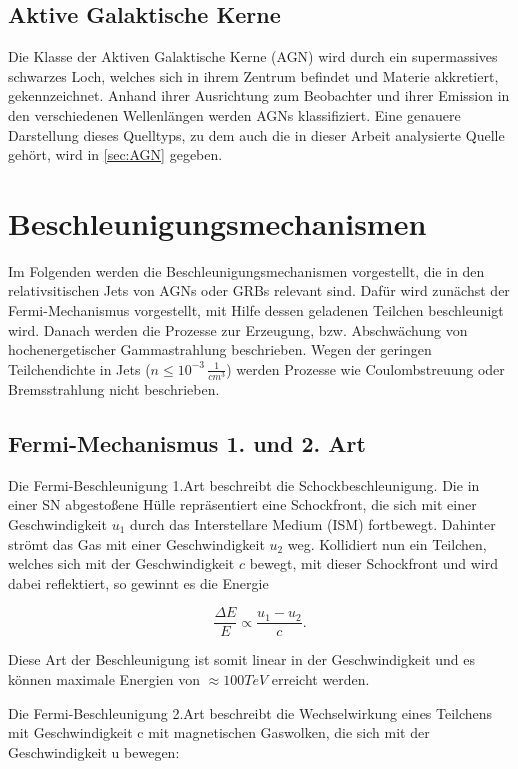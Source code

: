 \subsection{Aktive Galaktische Kerne}
Die Klasse der Aktiven Galaktische Kerne (AGN) wird durch ein supermassives schwarzes Loch, welches sich in ihrem Zentrum befindet und Materie akkretiert, gekennzeichnet. 
Anhand ihrer Ausrichtung zum Beobachter und ihrer Emission in den verschiedenen Wellenlängen werden AGNs klassifiziert. 
Eine genauere Darstellung dieses Quelltyps, zu dem auch die in dieser Arbeit analysierte Quelle gehört, wird in \autoref{sec:AGN} gegeben.

\section{Beschleunigungsmechanismen} 
\label{sec:Beschleunigungsmechanismen}
Im Folgenden werden die Beschleunigungsmechanismen vorgestellt, die in den relativsitischen Jets von AGNs oder GRBs relevant sind.
Dafür wird zunächst der Fermi-Mechanismus vorgestellt, mit Hilfe dessen geladenen Teilchen beschleunigt wird.
Danach werden die Prozesse zur Erzeugung, bzw. Abschwächung von hochenergetischer Gammastrahlung beschrieben.
Wegen der geringen Teilchendichte in Jets ($n\leq 10^{-3}\,\frac{1}{cm^3}$) werden Prozesse wie Coulombstreuung oder Bremsstrahlung nicht beschrieben.

\subsection{Fermi-Mechanismus 1. und 2. Art}
Die Fermi-Beschleunigung 1.Art beschreibt die Schockbeschleunigung.
Die in einer SN abgestoßene Hülle repräsentiert eine Schockfront, die sich mit einer Geschwindigkeit $u_1$ durch das Interstellare Medium (ISM) fortbewegt. 
Dahinter strömt das Gas mit einer Geschwindigkeit $u_2$ weg.
Kollidiert nun ein Teilchen, welches sich mit der Geschwindigkeit $c$ bewegt, mit dieser Schockfront und wird dabei reflektiert, so gewinnt es die Energie

\begin{equation}
 \frac{\Delta E}{E}\propto \frac{u_1-u_2}{c}.
\end{equation}

Diese Art der Beschleunigung ist somit linear in der Geschwindigkeit und es können maximale Energien von $\approx 100\si{TeV}$ erreicht werden.\cite{Grupen}\cite{Longair}

Die Fermi-Beschleunigung 2.Art beschreibt die Wechselwirkung eines Teilchens mit Geschwindigkeit c mit magnetischen Gaswolken, die sich mit der Geschwindigkeit u bewegen:

